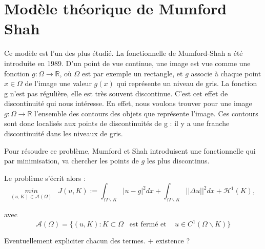 \section{Modèle théorique de Mumford Shah}

Ce modèle est l'un des plus étudié. La fonctionnelle de Mumford-Shah a été introduite en 1989. D'un point de vue continue, une image est vue comme une fonction $g : \Omega \rightarrow \mathbb{R}$, où $\Omega$ est par exemple un rectangle, et $g$ associe à chaque point $x \in \Omega$ de l'image une valeur $g(x)$ qui représente un niveau de gris. La fonction g n'est pas régulière, elle est très souvent discontinue. C'est cet effet de discontinuité qui nous intéresse. En effet, nous voulons trouver pour une image $g : \Omega \rightarrow \mathbb{R}$ l'ensemble des contours des objets que représente l'image. Ces contours sont donc localisés aux points de discontinuités de g : il y a une franche discontinuité dans les niveaux de gris.

Pour résoudre ce problème, Mumford et Shah introduisent une fonctionnelle qui par minimisation, va chercher les points de $g$ les plus discontinus.

\bigskip

Le problème s'écrit alors : 
\[\underset{(u, K) \in \mathcal{A}(\Omega)}{min} \; \; \; J(u,K) := \int_{\Omega \backslash K} |u - g |^2 dx + \int_{\Omega \backslash K} ||\Delta u ||^2 dx + \mathcal{H}^1(K) ,  \]

avec 
\[ \mathcal{A} (\Omega) = \{ (u,K) : K \subset \Omega \; \; \; \text{est fermé et } \; \; \; u \in C^1(\Omega \backslash K) \} \] 

Eventuellement expliciter chacun des termes. + existence ?